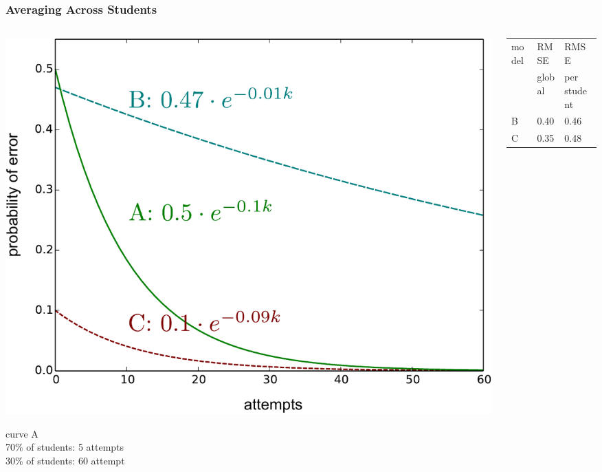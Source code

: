 \documentclass[bigger]{beamer}
\begin{document}
\begin{frame}
  \frametitle{Averaging Across Students}

  \begin{columns}   
    \begin{column}{.5\linewidth}
      \includegraphics[width=\linewidth]{scenario-studentavg}

      \medskip

curve A\\
70\% of students: 5 attempts\\
30\% of students: 60 attempt
    \end{column}
    \begin{column}{.5\linewidth}
  \begin{tabular}{lll}
  \toprule
  model & RMSE & RMSE \\
  & global & per student \\
 \midrule
 B & 0.40 & 0.46 \\
 C & 0.35 & 0.48  \\
  \bottomrule  
\end{tabular}
    \end{column}
  \end{columns}
\end{frame}
\end{document}
